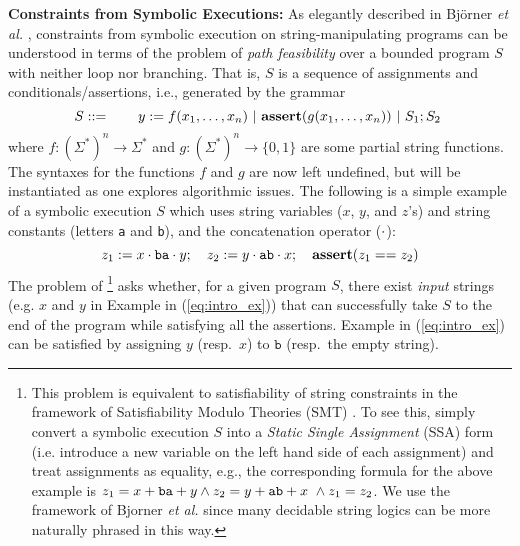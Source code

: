 \smallskip
\noindent
\textbf{Constraints from Symbolic Executions: }
As elegantly described in Bj\"{o}rner \emph{et al.} \cite{BTV09}, constraints 
from symbolic 
execution on string-manipulating programs can be understood in terms of the
problem of \emph{path 
feasibility} over a bounded program $S$ with neither loop nor
branching. %
That is, $S$ is a sequence of assignments and conditionals/assertions, i.e., 
generated by the grammar
\begin{equation}
    S ::= \qquad y := f(x_1,\ldots,x_n) \ |\ \text{\ASSERT{$g(x_1,\ldots,x_n)$}}\ |\ 
            S_1; S_2\ 
            \label{eq:symbex}
\end{equation}
where $f: (\Sigma^*)^n \to \Sigma^*$ and $g: (\Sigma^*)^n \to \{0,1\}$ are
some partial string functions. 
The syntaxes for the functions $f$ and $g$ are now
left undefined, but will be instantiated as one explores algorithmic issues.
The following is a simple example of a symbolic execution $S$
which uses string variables ($x$, $y$, and $z$'s) and string constants
(letters \texttt{a} and \texttt{b}), and the concatenation operator ($\cdot$):
\begin{equation}
        z_1 := x \cdot \text{\texttt{ba}} \cdot y;\quad 
        z_2 := y \cdot \text{\texttt{ab}} \cdot x;\quad
        \textbf{assert}(z_1 == z_2)
        \label{eq:intro_ex}
\end{equation}
The problem of \footnote{
    This problem is equivalent to 
satisfiability of string constraints in the framework of Satisfiability Modulo
Theories (SMT) \cite{SMT-CACM,SMT-chapter,KS08}.
To see this, simply convert a symbolic execution $S$ 
into a \emph{Static Single Assignment} (SSA) form (i.e. introduce a new 
variable 
on the left hand side of each assignment) and treat assignments as equality,
e.g., the corresponding formula for the above example is
        $z_1 = x + \text{\texttt{ba}} + y \wedge
        z_2 = y + \text{\texttt{ab}} + x\ \wedge
        z_1 = z_2$.
We use the framework of Bjorner \emph{et al.} \cite{BTV09} 
since many decidable string logics can be more naturally phrased in this
way.}
asks whether, for a given program $S$, there exist \emph{input} strings (e.g.
$x$ and $y$ in Example in (\ref{eq:intro_ex}))
that can successfully take
$S$ to the end of the program while satisfying all the assertions. 
Example in (\ref{eq:intro_ex}) can be satisfied by
assigning $y$ (resp.~$x$) to $\texttt{b}$ (resp.~the empty string). 


